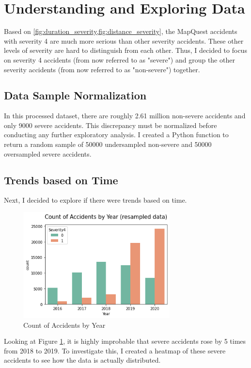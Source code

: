 \section{Understanding and Exploring Data}
\label{section:exploratory_analysis}

Based on \cref{fig:duration_severity,fig:distance_severity}, the MapQuest accidents with severity 4 are much more serious than other severity accidents. These other levels of severity are hard to distinguish from each other. Thus, I decided to focus on severity 4 accidents (from now referred to as "severe") and group the other severity accidents (from now referred to as "non-severe") together.

\subsection{Data Sample Normalization}
In this processed dataset, there are roughly 2.61 million non-severe accidents and only 9000 severe accidents. This discrepancy must be normalized before conducting any further exploratory analysis. I created a Python function to return a random sample of 50000 undersampled non-severe and 50000 oversampled severe accidents.

\subsection{Trends based on Time}
\noindent
Next, I decided to explore if there were trends based on time.

\begin{figure}[H]
    \centering
    \includegraphics[width=80mm,height=\textheight,keepaspectratio]{images/accident_counts.png}
    \caption{Count of Accidents by Year}
    \label{fig:accidents_year}
\end{figure}

\noindent
Looking at Figure \ref{fig:accidents_year}, it is highly improbable that severe accidents rose by 5 times from 2018 to 2019. To investigate this, I created a heatmap of these severe accidents to see how the data is actually distributed.

